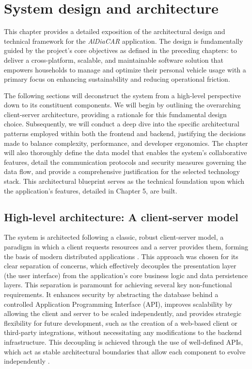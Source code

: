 \chapter{System design and architecture}

This chapter provides a detailed exposition of the architectural design and technical framework for the \textit{AlDiaCAR} application. The design is fundamentally guided by the project's core objectives as defined in the preceding chapters: to deliver a cross-platform, scalable, and maintainable software solution that empowers households to manage and optimize their personal vehicle usage with a primary focus on enhancing sustainability and reducing operational friction.

\textgap

The following sections will deconstruct the system from a high-level perspective down to its constituent components. We will begin by outlining the overarching client-server architecture, providing a rationale for this fundamental design choice. Subsequently, we will conduct a deep dive into the specific architectural patterns employed within both the frontend and backend, justifying the decisions made to balance complexity, performance, and developer ergonomics. The chapter will also thoroughly define the data model that enables the system's collaborative features, detail the communication protocols and security measures governing the data flow, and provide a comprehensive justification for the selected technology stack. This architectural blueprint serves as the technical foundation upon which the application's features, detailed in Chapter 5, are built.

\section{High-level architecture: A client-server model}

The system is architected following a classic, robust client-server model, a paradigm in which a client requests resources and a server provides them, forming the basis of modern distributed applications \cite{Tanenbaum2011ComputerNetworks}. This approach was chosen for its clear separation of concerns, which effectively decouples the presentation layer (the user interface) from the application's core business logic and data persistence layers. This separation is paramount for achieving several key non-functional requirements. It enhances security by abstracting the database behind a controlled Application Programming Interface (API), improves scalability by allowing the client and server to be scaled independently, and provides strategic flexibility for future development, such as the creation of a web-based client or third-party integrations, without necessitating any modifications to the backend infrastructure. This decoupling is achieved through the use of well-defined APIs, which act as stable architectural boundaries that allow each component to evolve independently \cite{Martin2017CleanArchitecture}.

